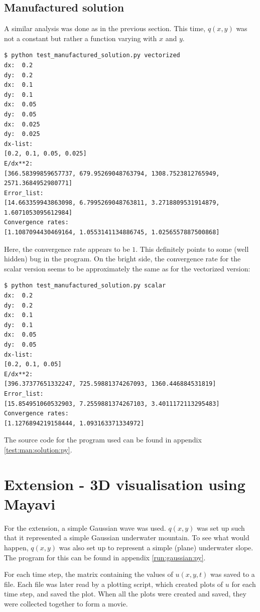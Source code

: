 \documentclass[twoside]{article}
\begin{document}
\subsection{Manufactured solution}

A similar analysis was done as in the previous section. This time, $q(x,y)$ was not a constant but rather a function varying with $x$ and $y$.

\begin{verbatim}
$ python test_manufactured_solution.py vectorized
dx:  0.2
dy:  0.2
dx:  0.1
dy:  0.1
dx:  0.05
dy:  0.05
dx:  0.025
dy:  0.025
dx-list:
[0.2, 0.1, 0.05, 0.025]
E/dx**2: 
[366.58399859657737, 679.95269048763794, 1308.7523812765949, 2571.3684952980771]
Error_list:
[14.663359943863098, 6.7995269048763811, 3.2718809531914879, 1.6071053095612984]
Convergence rates: 
[1.1087094430469164, 1.0553141134886745, 1.0256557887500868]
\end{verbatim}

Here, the convergence rate appears to be $1$. This definitely points to some (well hidden) bug in the program.
On the bright side, the convergence rate for the scalar version seems to be approximately the same as for the vectorized version:
\begin{verbatim}
$ python test_manufactured_solution.py scalar
dx:  0.2
dy:  0.2
dx:  0.1
dy:  0.1
dx:  0.05
dy:  0.05
dx-list:
[0.2, 0.1, 0.05]
E/dx**2: 
[396.37377651332247, 725.59881374267093, 1360.446884531819]
Error_list:
[15.854951060532903, 7.2559881374267103, 3.4011172113295483]
Convergence rates: 
[1.1276894219158444, 1.093163371334972]
\end{verbatim}

The source code for the program used can be found in appendix \ref{test:man:solution:py}.


\section{Extension - 3D visualisation using Mayavi}

For the extension, a simple Gaussian wave was used. $q(x,y)$ was set up such that it represented a simple Gaussian underwater mountain. To see what would happen, $q(x,y)$ was also set up to represent a simple (plane) underwater slope. The program for this can be found in appendix \ref{run:gaussian:py}.

For each time step, the matrix containing the values of $u(x,y,t)$ was saved to a file. Each file was later read by a plotting script, which created plots of $u$ for each time step, and saved the plot. When all the plots were created and saved, they were collected together to form a movie. 
\end{document}
